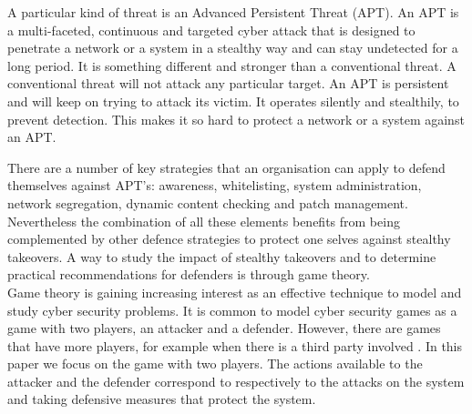 A particular kind of threat is an Advanced Persistent Threat (APT). An APT is a multi-faceted, continuous and targeted cyber attack that is designed to penetrate a network or a system in a stealthy way and can stay undetected for a long period. It is something different and stronger than a conventional threat. A conventional threat will not attack any particular target. An APT is persistent and will keep on trying to attack its victim. It operates silently and stealthily, to prevent detection. This makes it so hard to protect a network or a system against an APT. 



There are a number of key strategies that an organisation can apply to defend themselves against APT's: awareness, whitelisting, system administration, network segregation, dynamic content checking and patch management. Nevertheless the combination of all these elements benefits from being complemented by other defence strategies to protect one selves against stealthy takeovers. A way to study the impact of stealthy takeovers and to determine practical recommendations for defenders is through game theory.\\
Game theory is gaining increasing interest as an effective technique to model and study cyber security problems. It is common to model cyber security games as a game with two players, an attacker and a defender. However, there are games that have more players, for example when there is a third party involved \cite{fengstealthy}. In this paper we focus on the game with two players. The actions available to the attacker and the defender correspond to respectively to the attacks on the system and taking defensive measures that protect the system. \\

